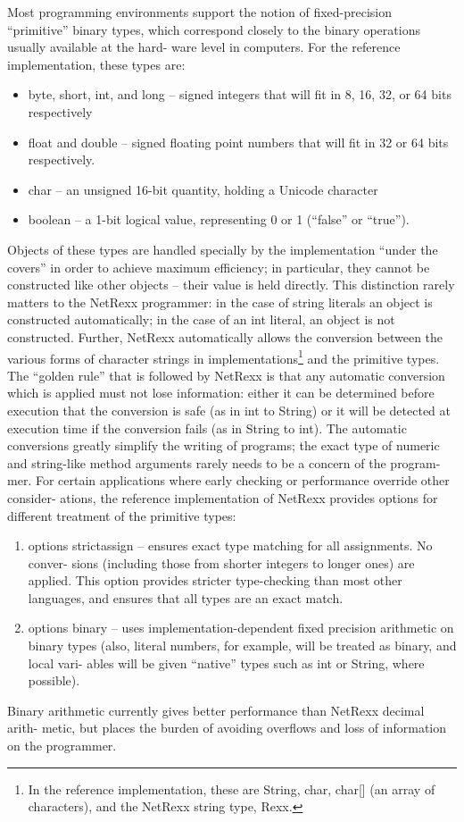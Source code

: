 Most programming environments support the notion of fixed-precision
“primitive” binary types, which correspond closely to the binary
operations usually available at the hard- ware level in computers. For
the reference implementation, these types are:
\begin{itemize}
\item byte, short, int, and long – signed integers that will fit in 8, 16, 32, or 64 bits respectively
\item float and double – signed floating point numbers that will fit in 32 or 64 bits respectively.
\item char – an unsigned 16-bit quantity, holding a Unicode character
\item boolean – a 1-bit logical value, representing 0 or 1 (“false” or
  “true”).
\end{itemize}
Objects of these types are handled specially by the implementation “under the covers” in order to achieve maximum efficiency; in particular, they cannot be constructed like other objects – their value is held directly. This distinction rarely matters to the NetRexx programmer: in the case of string literals an object is constructed automatically; in the case of an int literal, an object is not constructed.
Further, NetRexx automatically allows the conversion between the various forms of character strings in implementations\footnote{In the reference implementation, these are String, char, char[] (an array of characters), and the NetRexx string type, Rexx.} and the primitive types. The “golden rule” that is followed by NetRexx is that any automatic conversion which is applied must not lose information: either it can be determined before execution that the conversion is safe (as in int to String) or it will be detected at execution time if the conversion fails (as in String to int).
The automatic conversions greatly simplify the writing of programs; the exact type of numeric and string-like method arguments rarely needs to be a concern of the program- mer.
For certain applications where early checking or performance override
other consider- ations, the reference implementation of NetRexx
provides options for different treatment of the primitive types:
\begin{enumerate}
\item options strictassign – ensures exact type matching for all assignments. No conver- sions (including those from shorter integers to longer ones) are applied. This option provides stricter type-checking than most other languages, and ensures that all types are an exact match.
\item options binary – uses implementation-dependent fixed precision
arithmetic on binary types (also, literal numbers, for example, will
be treated as binary, and local vari- ables will be given “native”
types such as int or String, where possible).
\end{enumerate}
Binary arithmetic currently gives better performance than NetRexx
decimal arith- metic, but places the burden of avoiding overflows and
loss of information on the programmer.


